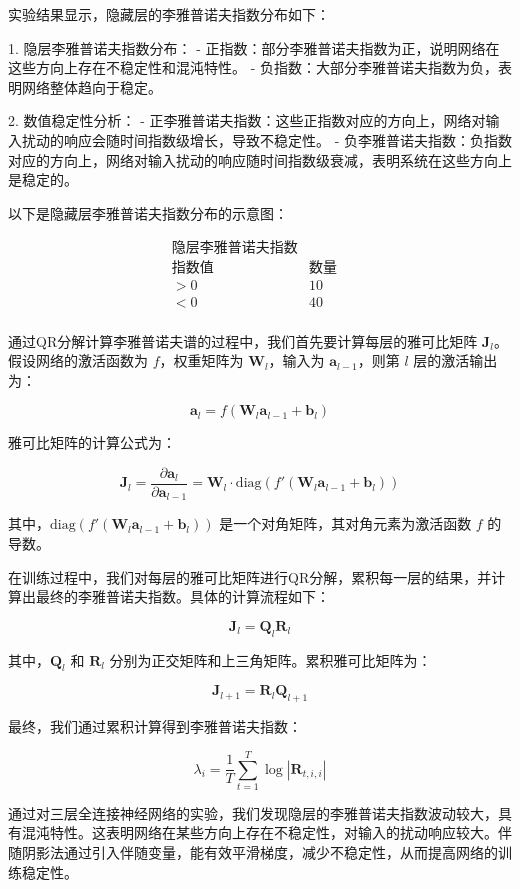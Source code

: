 实验结果显示，隐藏层的李雅普诺夫指数分布如下：



1. 隐层李雅普诺夫指数分布：
   - 正指数：部分李雅普诺夫指数为正，说明网络在这些方向上存在不稳定性和混沌特性。
   - 负指数：大部分李雅普诺夫指数为负，表明网络整体趋向于稳定。

2. 数值稳定性分析：
   - 正李雅普诺夫指数：这些正指数对应的方向上，网络对输入扰动的响应会随时间指数级增长，导致不稳定性。
   - 负李雅普诺夫指数：负指数对应的方向上，网络对输入扰动的响应随时间指数级衰减，表明系统在这些方向上是稳定的。

以下是隐藏层李雅普诺夫指数分布的示意图：

\[
\begin{array}{ccc}
\text{隐层李雅普诺夫指数} & & \\
\hline
\text{指数值} & \text{数量} \\
\hline
>0 & 10 \\
<0 & 40 \\
\end{array}
\]

通过QR分解计算李雅普诺夫谱的过程中，我们首先要计算每层的雅可比矩阵 \(\mathbf{J}_l\)。假设网络的激活函数为 \( f \)，权重矩阵为 \(\mathbf{W}_l\)，输入为 \(\mathbf{a}_{l-1}\)，则第 \(l\) 层的激活输出为：

\[
\mathbf{a}_l = f(\mathbf{W}_l \mathbf{a}_{l-1} + \mathbf{b}_l)
\]

雅可比矩阵的计算公式为：

\[
\mathbf{J}_l = \frac{\partial \mathbf{a}_l}{\partial \mathbf{a}_{l-1}} = \mathbf{W}_l \cdot \text{diag}(f'(\mathbf{W}_l \mathbf{a}_{l-1} + \mathbf{b}_l))
\]

其中，\(\text{diag}(f'(\mathbf{W}_l \mathbf{a}_{l-1} + \mathbf{b}_l))\) 是一个对角矩阵，其对角元素为激活函数 \(f\) 的导数。

在训练过程中，我们对每层的雅可比矩阵进行QR分解，累积每一层的结果，并计算出最终的李雅普诺夫指数。具体的计算流程如下：

\[
\mathbf{J}_l = \mathbf{Q}_l \mathbf{R}_l
\]

其中，\(\mathbf{Q}_l\) 和 \(\mathbf{R}_l\) 分别为正交矩阵和上三角矩阵。累积雅可比矩阵为：

\[
\mathbf{J}_{l+1} = \mathbf{R}_l \mathbf{Q}_{l+1}
\]

最终，我们通过累积计算得到李雅普诺夫指数：

\[
\lambda_i = \frac{1}{T} \sum_{t=1}^T \log |\mathbf{R}_{t,i,i}|
\]

通过对三层全连接神经网络的实验，我们发现隐层的李雅普诺夫指数波动较大，具有混沌特性。这表明网络在某些方向上存在不稳定性，对输入的扰动响应较大。伴随阴影法通过引入伴随变量，能有效平滑梯度，减少不稳定性，从而提高网络的训练稳定性。

